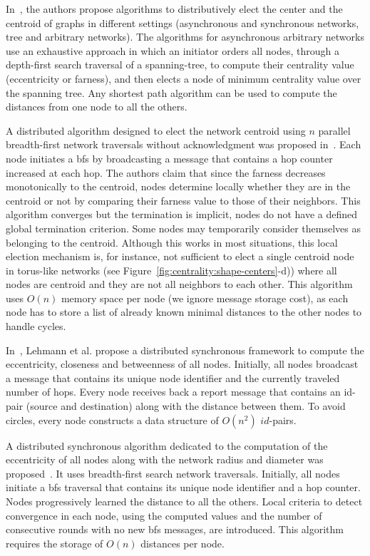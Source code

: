 In~\cite{Korach:1984:DAF:579.585}, the authors propose algorithms to distributively elect the center and the centroid of graphs in different settings (asynchronous and synchronous networks, tree and arbitrary networks). The algorithms for asynchronous arbitrary networks use an exhaustive approach in which an initiator orders all nodes, through a depth-first search traversal of a spanning-tree, to compute their centrality value (eccentricity or farness), and then elects a node of minimum centrality value over the spanning tree. Any shortest path algorithm can be used to compute the distances from one node to all the others.

A distributed algorithm designed to elect the network centroid using $n$ parallel breadth-first network traversals without acknowledgment was proposed in~\cite{mamei2005self}. Each node initiates a \gls{bfs} by broadcasting a message that contains a hop counter increased at each hop. The authors claim that since the farness decreases monotonically to the centroid, nodes determine locally whether they are in the centroid or not by comparing their farness value to those of their neighbors. This algorithm converges but the termination is implicit, nodes do not have a defined global termination criterion. Some nodes may temporarily consider themselves as belonging to the centroid. Although this works in most situations, this local election mechanism is, for instance, not sufficient to elect a single centroid node in torus-like networks (see Figure~\ref{fig:centrality:shape-centers}-d)) where all nodes are centroid and they are not all neighbors to each other. This algorithm uses $O(n)$ memory space per node (we ignore message storage cost), as each node has to store a list of already known minimal distances to the other nodes to handle cycles.

In~\cite{lehmann2003decentralized}, Lehmann et al. propose a distributed synchronous framework to compute the eccentricity, closeness and betweenness of all nodes. Initially, all nodes broadcast a message that contains its unique node identifier and the currently traveled number of hops. Every node receives back a report message that contains an id-pair (source and destination) along with the distance between them. To avoid circles, every node constructs a data structure of $O(n^2)$ $id$-pairs.

A distributed synchronous algorithm dedicated to the computation of the eccentricity of all nodes along with the network radius and diameter was proposed~\cite{almeida2012fast}. It uses breadth-first search network traversals. Initially, all nodes initiate a \gls{bfs} traversal that contains its unique node identifier and a hop counter. Nodes progressively learned the distance to all the others. Local criteria to detect convergence in each node, using the computed values and the number of consecutive rounds with no new \gls{bfs} messages, are introduced. This algorithm requires the storage of $O(n)$ distances per node.

